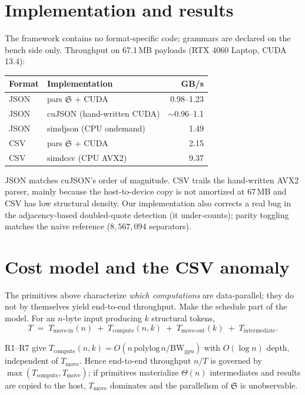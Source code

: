\documentclass[11pt]{article}
\begin{document}
\section{Implementation and results}
The framework contains no format-specific code; grammars are declared on the
bench side only.  Throughput on 67.1\,MB payloads (RTX 4060 Laptop, CUDA 13.4):
\begin{center}
\begin{tabular}{@{}llr@{}}
\toprule
Format & Implementation & GB/s\\
\midrule
JSON & pars $\mathfrak{S}$ + CUDA & 0.98--1.23\\
JSON & cuJSON (hand-written CUDA) & $\sim$0.96--1.1\\
JSON & simdjson (CPU ondemand) & 1.49\\
CSV  & pars $\mathfrak{S}$ + CUDA & 2.15\\
CSV  & simdcsv (CPU AVX2) & 9.37\\
\bottomrule
\end{tabular}
\end{center}
JSON matches cuJSON's order of magnitude.  CSV trails the hand-written AVX2
parser, mainly because the host-to-device copy is not amortized at 67\,MB and
CSV has low structural density.  Our implementation also corrects a real bug in
the adjacency-based doubled-quote detection (it under-counts); parity toggling
matches the naive reference ($8{,}567{,}094$ separators).

\section{Cost model and the CSV anomaly}
The primitives above characterize \emph{which computations} are data-parallel;
they do not by themselves yield end-to-end throughput.  Make the schedule part of
the model.  For an $n$-byte input producing $k$ structural tokens,
\[
T \;=\; T_{\mathrm{move\text{-}in}}(n) \;+\; T_{\mathrm{compute}}(n,k)
\;+\; T_{\mathrm{move\text{-}out}}(k) \;+\; T_{\mathrm{intermediate}} .
\]
\begin{theorem}
R1--R7 give $T_{\mathrm{compute}}(n,k)=O(n\,\mathrm{polylog}\,n / \mathrm{BW}_{\mathrm{gpu}})$
with $O(\log n)$ depth, independent of $T_{\mathrm{move}}$.  Hence end-to-end
throughput $n/T$ is governed by $\max(T_{\mathrm{compute}},T_{\mathrm{move}})$; if
primitives materialize $\Theta(n)$ intermediates and results are copied to the
host, $T_{\mathrm{move}}$ dominates and the parallelism of $\mathfrak{S}$ is unobservable.
\end{theorem}
\end{document}
